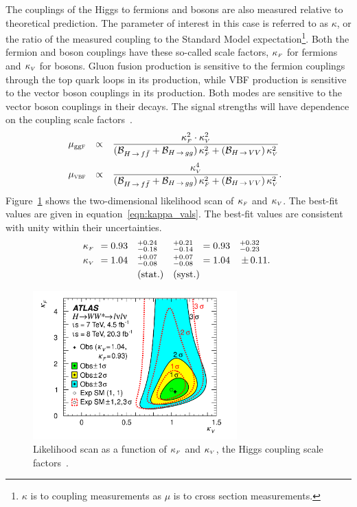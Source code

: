 The couplings of the Higgs to fermions and bosons are also measured relative to theoretical prediction. The parameter of interest in this case is referred to as $\kappa$, or the ratio of the measured coupling to the Standard Model expectation\footnote{$\kappa$ is to coupling measurements as $\mu$ is to cross section measurements.}. Both the fermion and boson couplings have these so-called scale factors, $\kappa_{\mbox{\tiny $F$}}$ for fermions and $\kappa_{\mbox{\tiny $V$}}$ for bosons. Gluon fusion production is sensitive to the fermion couplings through the top quark loops in its production, while VBF production is sensitive to the vector boson couplings in its production. Both modes are sensitive to the vector boson couplings in their decays. The signal strengths will have dependence on the coupling scale factors~\cite{LHCXSWG}. 
%
\begin{equation}
\np%
\begin{array}{lc l}
  \mu_{\scggF} &\propto &{\displaystyle\frac{\kF^2 \cdot \kV^2}{(\BF_{\Hff}+\BF_{\Hgg})\,\kF^2+(\BF_{\HVV})\,\kV^2}}\\ \clineskip\clineskip
  \mu_{\scVBF} &\propto &{\displaystyle\frac{\kV^4            }{(\BF_{\Hff}+\BF_{\Hgg})\,\kF^2+(\BF_{\HVV})\,\kV^2}} . 
\end{array}
\label{eqn:kappas}
\end{equation}
%
Figure~\ref{fig:kappas} shows the two-dimensional likelihood scan of $\kappa_{\mbox{\tiny $F$}}$ and $\kappa_{\mbox{\tiny $V$}}$. The best-fit values are given in equation~\ref{eqn:kappa_vals}. The best-fit values are consistent with unity within their uncertainties. 
%
\begin{equation}
\begin{array}{llllll}
\no\kF\no&=0.93\no&\,\,^{+0.24}_{-0.18}\np&^{+0.21}_{-0.14}\np&=0.93&^{+0.32}_{-0.23} \\ \clineskip
\no\kV\no&=1.04\no&\,\,^{+0.07}_{-0.08}\np&^{+0.07}_{-0.08}\np&=1.04&{\PM}0.11.\\ \clineskip
                     &        & ~\textrm{(stat.)}     &\textrm{(syst.)}\np
\end{array}
\label{eqn:kappa_vals}
\end{equation}
%
\begin{figure}[h!]
  \centering
  \captionsetup{justification=centering}

  \includegraphics[width=0.7\textwidth]{figures/kappas}
  \caption{Likelihood scan as a function of $\kappa_{\mbox{\tiny $F$}}$ and $\kappa_{\mbox{\tiny $V$}}$, the Higgs coupling scale factors~\cite{WW2015}.}
  \label{fig:kappas}
\end{figure}

